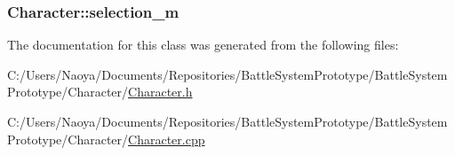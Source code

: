\subsubsection[{selection\+\_\+m}]{ Character\+::selection\+\_\+m\hspace{0.3cm}{\ttfamily [protected]}}\label{class_character_a55ee12bd3ec2b766fb3cbe20c3333fe6}


The documentation for this class was generated from the following files\+:\begin{DoxyCompactItemize}
\item 
C\+:/\+Users/\+Naoya/\+Documents/\+Repositories/\+Battle\+System\+Prototype/\+Battle\+System\+Prototype/\+Character/\hyperlink{_character_8h}{Character.\+h}\item 
C\+:/\+Users/\+Naoya/\+Documents/\+Repositories/\+Battle\+System\+Prototype/\+Battle\+System\+Prototype/\+Character/\hyperlink{_character_8cpp}{Character.\+cpp}\end{DoxyCompactItemize}
